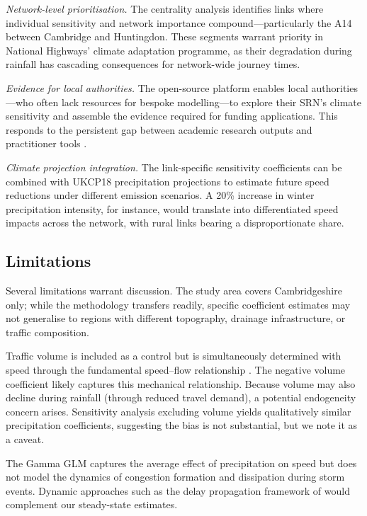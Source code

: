 \documentclass[review]{elsarticle}
\begin{document}
\textit{Network-level prioritisation.} The centrality analysis identifies links where individual sensitivity and network importance compound---particularly the A14 between Cambridge and Huntingdon. These segments warrant priority in National Highways' climate adaptation programme, as their degradation during rainfall has cascading consequences for network-wide journey times.

\textit{Evidence for local authorities.} The open-source platform enables local authorities---who often lack resources for bespoke modelling---to explore their SRN's climate sensitivity and assemble the evidence required for funding applications. This responds to the persistent gap between academic research outputs and practitioner tools \citep{unece2024stress,dft2024rea}.

\textit{Climate projection integration.} The link-specific sensitivity coefficients can be combined with UKCP18 precipitation projections \citep{ukcp18} to estimate future speed reductions under different emission scenarios. A 20\% increase in winter precipitation intensity, for instance, would translate into differentiated speed impacts across the network, with rural links bearing a disproportionate share.

\subsection{Limitations}
\label{sec:disc:limits}

Several limitations warrant discussion. The study area covers Cambridgeshire only; while the methodology transfers readily, specific coefficient estimates may not generalise to regions with different topography, drainage infrastructure, or traffic composition.

Traffic volume is included as a control but is simultaneously determined with speed through the fundamental speed--flow relationship \citep{greenshields1935study}. The negative volume coefficient likely captures this mechanical relationship. Because volume may also decline during rainfall (through reduced travel demand), a potential endogeneity concern arises. Sensitivity analysis excluding volume yields qualitatively similar precipitation coefficients, suggesting the bias is not substantial, but we note it as a caveat.

The Gamma GLM captures the average effect of precipitation on speed but does not model the dynamics of congestion formation and dissipation during storm events. Dynamic approaches such as the delay propagation framework of \citet{liu2026extreme} would complement our steady-state estimates.
\end{document}
